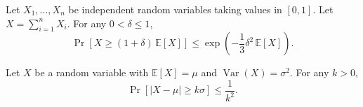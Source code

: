  
\begin{lemma}
\label{lem:con_cher}
Let \(X_1,\dots,X_n\) be independent random variables taking values in \([0,1]\).
Let \(X=\sum_{i=1}^n X_i\).
For any \(0 < \delta \le 1\),
\begin{equation*}
    \Pr[X \ge (1+\delta)\,\mathbb{E}[X]] 
  \leq \exp(-\frac{1}{3}\delta^{2}\,\mathbb{E}[X]).
\end{equation*}
    
\end{lemma}

\begin{lemma}
\label{lem:che_neq}
Let $X$ be a random variable with $\mathbb{E}[X]=\mu$ and $\operatorname{Var}(X)=\sigma^{2}$.  
For any $k>0$,
\begin{equation*}
  \Pr[|X-\mu|\ge k\sigma]\le\frac{1}{k^{2}} .
\end{equation*}
\end{lemma}


 


